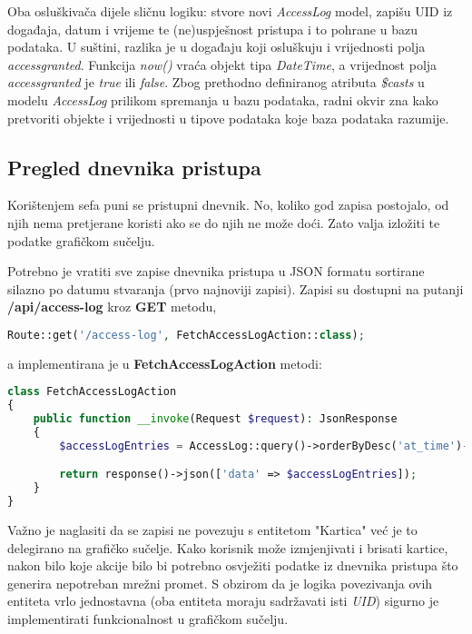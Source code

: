 Oba osluškivača dijele sličnu logiku: stvore novi \textit{AccessLog} model, zapišu UID iz događaja, datum i vrijeme te
(ne)uspješnost pristupa i to pohrane u bazu podataka.
U suštini, razlika je u događaju koji osluškuju i vrijednosti polja \textit{access\textunderscore granted}.
Funkcija \textit{now()} vraća objekt tipa \textit{DateTime}, a vrijednost polja \textit{access\textunderscore granted}
je \textit{true} ili \textit{false}.
Zbog prethodno definiranog atributa \textit{\$casts} u modelu \textit{AccessLog} prilikom spremanja u bazu podataka,
radni okvir zna kako pretvoriti objekte i vrijednosti u tipove podataka koje baza podataka razumije.

\subsection{Pregled dnevnika pristupa}

Korištenjem sefa puni se pristupni dnevnik.
No, koliko god zapisa postojalo, od njih nema pretjerane koristi ako se do njih ne može doći.
Zato valja izložiti te podatke grafičkom sučelju.

Potrebno je vratiti sve zapise dnevnika pristupa u JSON formatu sortirane silazno po datumu stvaranja (prvo najnoviji zapisi).
Zapisi su dostupni na putanji \textbf{/api/access-log} kroz \textbf{GET} metodu,

\begin{lstlisting}[language=PHP]
Route::get('/access-log', FetchAccessLogAction::class);
\end{lstlisting}

a implementirana je u \textbf{FetchAccessLogAction} metodi:

\begin{lstlisting}[language=PHP]
class FetchAccessLogAction
{
    public function __invoke(Request $request): JsonResponse
    {
        $accessLogEntries = AccessLog::query()->orderByDesc('at_time')->get();

        return response()->json(['data' => $accessLogEntries]);
    }
}
\end{lstlisting}

Važno je naglasiti da se zapisi ne povezuju s entitetom "Kartica" već je to delegirano na grafičko sučelje.
Kako korisnik može izmjenjivati i brisati kartice, nakon bilo koje akcije bilo bi potrebno osvježiti podatke iz dnevnika
pristupa što generira nepotreban mrežni promet.
S obzirom da je logika povezivanja ovih entiteta vrlo jednostavna (oba entiteta moraju sadržavati isti \textit{UID})
sigurno je implementirati funkcionalnost u grafičkom sučelju.

